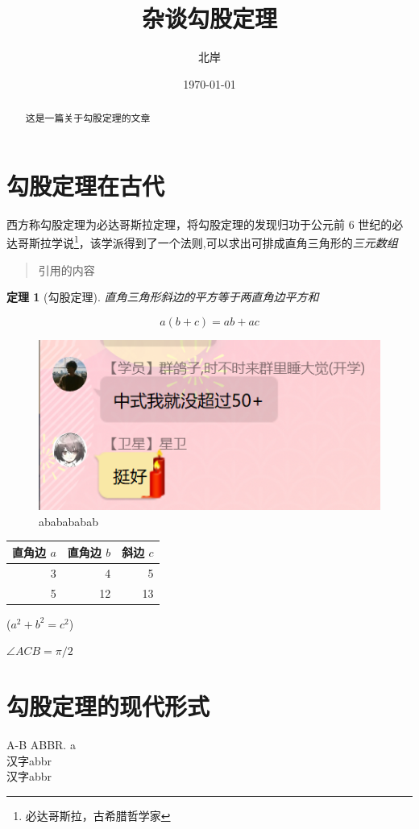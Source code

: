 \documentclass[UTF8]{ctexart}
\title{杂谈勾股定理}
\author{北岸}
\date{\today}
\newtheorem{thm}{定理}
\begin{document}
\maketitle

\begin{abstract}
	这是一篇关于勾股定理的文章
\end{abstract}

\tableofcontents

\section{勾股定理在古代}



西方称勾股定理为必达哥斯拉定理，将勾股定理的发现归功于公元前 6 世纪的必达哥斯拉学说\footnote{必达哥斯拉，古希腊哲学家}，该学派得到了一个法则,可以求出可排成直角三角形的\emph{三元数组}

\begin{quote}
	\kaishu 引用的内容
\end{quote}

\begin{thm}[勾股定理]
	直角三角形斜边的平方等于两直角边平方和
\end{thm}

\begin{equation}
	a(b+c)=ab+ac
\end{equation}

\begin{figure}[ht]
	\centering
	\includegraphics[scale=0.6]{images/1.png}
	\caption{ababababab}
	\label{fig:xiantu}
\end{figure}

\begin{table}[H]
	\begin{tabular}{|rrr|}
		\hline
		直角边 $a$ & 直角边 $b$ & 斜边 $c$ \\
		\hline
		3          & 4          & 5        \\
		5          & 12         & 13       \\
		\hline
	\end{tabular}
	\qquad
	($a^2+b^2=c^2$)
\end{table}


$\angle ACB = \pi / 2$

\section{勾股定理的现代形式}

A-B
ABBR. a\\
汉字abbr\\
\mbox{汉字}abbr
\end{document}
